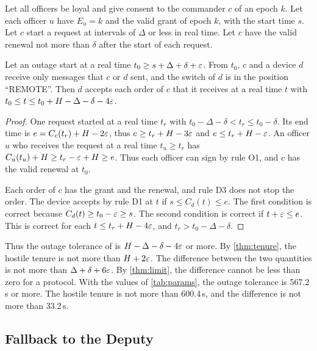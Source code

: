 \begin{thm}
\label{thm:tolerance}
Let all officers be loyal and give consent to the commander $c$ of an epoch $k$. Let each
officer $u$ have $E_u = k$ and the valid grant of epoch $k$, with the start time $s$. Let
$c$ start a request at intervals of $\Delta$ or less in real time. Let $c$ have the valid
renewal not more than $\delta$ after the start of each request.

Let an outage start at a real time $t_0 \ge s + \Delta + \delta + \varepsilon$. From $t_0$, $c$
and a device $d$ receive only messages that $c$ or $d$ sent, and the switch of $d$ is in
the position ``REMOTE''. Then $d$ accepts each order of $c$ that it receives at a real time
$t$ with $t_0 \le t \le t_0 + H - \Delta - \delta - 4\varepsilon$.
\end{thm}

\begin{proof}
One request started at a real time $t_r$ with $t_0 - \Delta - \delta < t_r \le t_0 -
\delta$. Its end time is $e = C_c(t_r) + H - 2\varepsilon$, thus $e \ge t_r + H - 3\varepsilon$ and
$e \le t_r + H - \varepsilon$. An officer $u$ who receives the request at a real time
$t_u \ge t_r$ has $C_u(t_u) + H \ge t_r - \varepsilon + H \ge e$. Thus each officer can sign by
rule O1, and $c$ has the valid renewal at $t_0$.

Each order of $c$ has the grant and the renewal, and rule D3 does not stop the order. The
device accepts by rule D1 at $t$ if $s \le C_d(t) \le e$. The first condition is
correct because $C_d(t) \ge t_0 - \varepsilon \ge s$. The second condition is correct if
$t + \varepsilon \le e$. This is correct for each $t \le t_r + H - 4\varepsilon$, and
$t_r > t_0 - \Delta - \delta$.
\end{proof}

Thus the outage tolerance of \sys{} is $H - \Delta - \delta - 4\varepsilon$ or more. By
\cref{thm:tenure}, the hostile tenure is not more than $H + 2\varepsilon$. The difference between the
two quantities is not more than $\Delta + \delta + 6\varepsilon$. By \cref{thm:limit}, the
difference cannot be less than zero for a protocol. With the values of \cref{tab:params},
the outage tolerance is 567.2\,s or more. The hostile tenure is not more than 600.4\,s, and the
difference is not more than 33.2\,s.

\subsection{Fallback to the Deputy}

